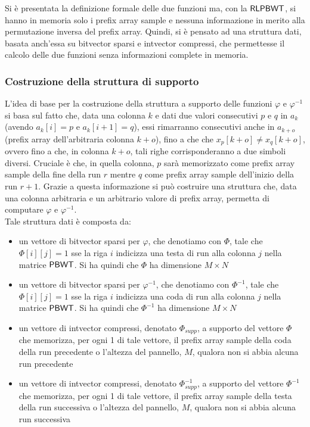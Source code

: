 Si è presentata la definizione formale delle due funzioni ma, con la $\mbox{\rm {\sf RLPBWT}}$,
si hanno in memoria solo i prefix array sample  e nessuna informazione in merito
alla permutazione inversa del 
prefix array. Quindi, si è pensato ad una struttura dati, basata
anch'essa su bitvector sparsi e intvector compressi, che permettesse il calcolo
delle due funzioni senza informazioni complete in memoria. 
\subsubsection{Costruzione della struttura di supporto}
L'idea di base per la costruzione della struttura a supporto delle
funzioni $\varphi$ e $\varphi^{-1}$ si
basa sul fatto che, data una colonna $k$ e dati due valori consecutivi $p$ e $q$
in $a_k$ (avendo $a_k[i]=p$ e $a_k[i+1]=q$), essi rimarranno consecutivi anche
in $a_{k+o}$ (prefix array dell'arbitraria colonna $k+o$), fino a che
che $x_{p}[k+o]\neq x_{q}[k+o]$, ovvero fino a che, in colonna $k+o$, tali righe
corrisponderanno a due simboli diversi. Cruciale è che, in quella colonna,
$p$ sarà memorizzato come prefix array sample della fine della run $r$
mentre $q$ come prefix array sample dell'inizio della run $r+1$. Grazie
a questa informazione si può costruire una struttura che, data una colonna
arbitraria e un arbitrario valore di prefix array, permetta di
computare $\varphi$ e $\varphi^{-1}$.\\
Tale struttura dati è composta da:
\begin{itemize}
  \item un vettore di bitvector sparsi per $\varphi$, che denotiamo con
  $\varPhi$, tale che $\varPhi[i][j]=1$ sse la riga $i$ indicizza una testa di
  run alla colonna $j$ nella matrice $\mbox{\rm {\sf PBWT}}$. Si ha quindi che $\varPhi$
  ha dimensione $M\times N$
  \item un vettore di bitvector sparsi per $\varphi^{-1}$, che
  denotiamo con $\varPhi^{-1}$, tale che $\varPhi[i][j]=1$ sse la riga $i$
  indicizza una coda di run alla colonna $j$ nella matrice $\mbox{\rm {\sf PBWT}}$. Si ha
  quindi che $\varPhi^{-1}$ ha dimensione $M\times N$
  \item un vettore di intvector compressi, denotato $\varPhi_{supp}$, a supporto
  del vettore $\varPhi$ che memorizza, per ogni 1 di tale vettore, il
  prefix array sample della coda della run precedente o l'altezza
  del pannello, $M$, qualora non si abbia alcuna run precedente
  \item un vettore di intvector compressi, denotato $\varPhi^{-1}_{supp}$,
  a supporto del vettore $\varPhi^{-1}$ che memorizza, per ogni 1 di tale vettore,
  il prefix array sample della testa della run successiva o l'altezza
  del pannello, $M$, qualora non si abbia alcuna run successiva
\end{itemize}
